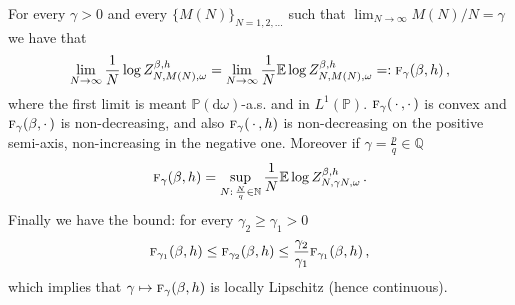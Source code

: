 \documentclass[AHL,Unicode,longabstracts]{cedram}
\newcommand{\gb}{\beta}
\newcommand{\go}{\omega}
\newcommand{\dd}{\mathrm{d}}
\newcommand{\tf}{\textsc{f}} %
\newcommand{\bbE}{\ensuremath{\mathbb{E}}}
\newcommand{\bbN}{\ensuremath{\mathbb{N}}}
\newcommand{\bbP}{\ensuremath{\mathbb{P}}}
\newcommand{\bbQ}{\ensuremath{\mathbb{Q}}}
\begin{document}
\begin{prop}\label{th:existence+}
For every $\gamma>0$ and every $\{M(N)\}_{N=1,2, \ldots}$ such that $\lim_{N \to \infty} M(N)/N=\gamma$ we have that
\begin{equation}\label{eq:existence+.1}
\lim_{N \to \infty} \frac{1}{N} \log Z_{N,M(N), \go}^{\gb,h}= \lim_{N \to \infty}
\frac{1}{N} \bbE \log Z_{N,M(N), \go}^{\gb,h} =: \tf_\gamma(\gb, h)\,,
\end{equation}
where the first limit is meant $\bbP(\dd \go)$-a.s. and in $L^1 (\bbP)$. $\tf_\gamma ({\,\cdot\,,\cdot\,})$ is convex and $\tf_\gamma ({\gb,\cdot\,})$ is non-decreasing, and also $\tf_\gamma ({\,\cdot\,,h})$ is non-decreasing on the positive semi-axis, non-increasing in the negative one. Moreover if $\gamma=\frac{p}{q}\in \bbQ$
\begin{equation}\label{eq:existence+.2}
\tf_\gamma (\gb, h) = \sup_{N:\,\frac{N}{q}\in \bbN} \frac{1}{N} \bbE \log Z_{N, \gamma N, \go}^{\gb,h}\,.
\end{equation}
Finally we have the bound: for every $\gamma_2\ge \gamma_1 >0$
\begin{equation}\label{eq:existence+.3}
\tf_{\gamma_1}(\gb, h) \le \tf_{\gamma_2}(\gb, h)\le \frac{\gamma_2}{\gamma_1} \tf_{\gamma_1}(\gb, h)\,,
\end{equation}
which implies that $\gamma \mapsto \tf_{\gamma}(\gb, h)$ is locally Lipschitz (hence continuous).
\end{prop}
\end{document}
